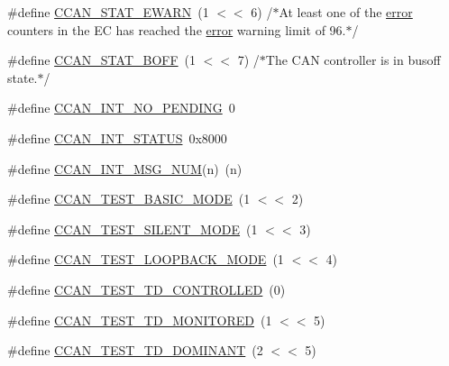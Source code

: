 \begin{DoxyCompactItemize}
\item 
\#define \hyperlink{group___c_c_a_n__18_x_x__43_x_x_ga1775fca8e7a3c3c5b4572f4a60be573b}{C\+C\+A\+N\+\_\+\+S\+T\+A\+T\+\_\+\+E\+W\+A\+RN}~(1 $<$$<$ 6)	/$\ast$At least one of the \hyperlink{group__utils_gaad9796c174f7ef5d226cd169f2520fd5}{error} counters in the EC has reached the \hyperlink{group__utils_gaad9796c174f7ef5d226cd169f2520fd5}{error} warning limit of 96.$\ast$/
\item 
\#define \hyperlink{group___c_c_a_n__18_x_x__43_x_x_gaf5bda007aa17c3fe3f8a8417dd5feb1e}{C\+C\+A\+N\+\_\+\+S\+T\+A\+T\+\_\+\+B\+O\+FF}~(1 $<$$<$ 7)	/$\ast$The C\+AN controller is in busoff state.$\ast$/
\item 
\#define \hyperlink{group___c_c_a_n__18_x_x__43_x_x_ga6729e4f8bb1311806c9437247ba43b09}{C\+C\+A\+N\+\_\+\+I\+N\+T\+\_\+\+N\+O\+\_\+\+P\+E\+N\+D\+I\+NG}~0
\item 
\#define \hyperlink{group___c_c_a_n__18_x_x__43_x_x_gaa3060227684cfad8ba747a13eae24bdc}{C\+C\+A\+N\+\_\+\+I\+N\+T\+\_\+\+S\+T\+A\+T\+US}~0x8000
\item 
\#define \hyperlink{group___c_c_a_n__18_x_x__43_x_x_ga070e17d49a2c87d14452ff17fcbf212e}{C\+C\+A\+N\+\_\+\+I\+N\+T\+\_\+\+M\+S\+G\+\_\+\+N\+UM}(n)~(n)
\item 
\#define \hyperlink{group___c_c_a_n__18_x_x__43_x_x_ga5b82b859cbcbfbea3ee778cfdcde0e85}{C\+C\+A\+N\+\_\+\+T\+E\+S\+T\+\_\+\+B\+A\+S\+I\+C\+\_\+\+M\+O\+DE}~(1 $<$$<$ 2)
\item 
\#define \hyperlink{group___c_c_a_n__18_x_x__43_x_x_ga106d940b349f6405cd9b29fb96e7be2c}{C\+C\+A\+N\+\_\+\+T\+E\+S\+T\+\_\+\+S\+I\+L\+E\+N\+T\+\_\+\+M\+O\+DE}~(1 $<$$<$ 3)
\item 
\#define \hyperlink{group___c_c_a_n__18_x_x__43_x_x_ga9ee2a6a2c209e479ef82adb269ac3919}{C\+C\+A\+N\+\_\+\+T\+E\+S\+T\+\_\+\+L\+O\+O\+P\+B\+A\+C\+K\+\_\+\+M\+O\+DE}~(1 $<$$<$ 4)
\item 
\#define \hyperlink{group___c_c_a_n__18_x_x__43_x_x_gaf071106b7661b748890a07ebdeeba2f2}{C\+C\+A\+N\+\_\+\+T\+E\+S\+T\+\_\+\+T\+D\+\_\+\+C\+O\+N\+T\+R\+O\+L\+L\+ED}~(0)
\item 
\#define \hyperlink{group___c_c_a_n__18_x_x__43_x_x_gaab61e1f43219a34dc6dd86a0c1c367b8}{C\+C\+A\+N\+\_\+\+T\+E\+S\+T\+\_\+\+T\+D\+\_\+\+M\+O\+N\+I\+T\+O\+R\+ED}~(1 $<$$<$ 5)
\item 
\#define \hyperlink{group___c_c_a_n__18_x_x__43_x_x_gacc375f1ade23712882d71808600ad0f2}{C\+C\+A\+N\+\_\+\+T\+E\+S\+T\+\_\+\+T\+D\+\_\+\+D\+O\+M\+I\+N\+A\+NT}~(2 $<$$<$ 5)
\item 
$$
\end{DoxyCompactItemize}
